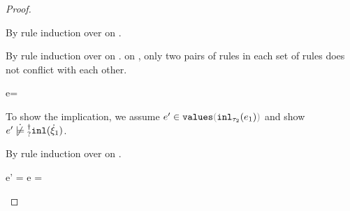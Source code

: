\begin{proof}
\begin{byCases}
      By rule induction over  on .
      \begin{byCases}
        \item[\text{(\ref{rule:FVal})}]
          \begin{pfsteps}
          \item {}  
          \end{pfsteps}
          By rule induction over  on .
           on , only two pairs of rules in each set
          of rules does not conflict with each other.
          \begin{byCases}
            \item[\text{(\ref{rule:VInl}, \ref{rule:TInl})}]
              \begin{pfsteps}
              \item e= 
              \item {}  
              \item {}  
              \item {}  
              \end{pfsteps}
              To show the implication, we assume $\inValues{e'}{\hinl{\tau_2}{e_1}}$ and show $\cnotsatisfyormay{e'}{\cinl{\hxi_1}}$.
              \begin{pfsteps}
              \item {}  
              \end{pfsteps}
              By rule induction over  on .
              \begin{byCases}
                \item[\text{(\ref{rule:IVVal})}]
                \begin{pfsteps}
                \item e' = e =  
                \item {} 
                \end{pfsteps}


\end{byCases}
\end{byCases}
\end{byCases}
\end{byCases}
\end{proof}
